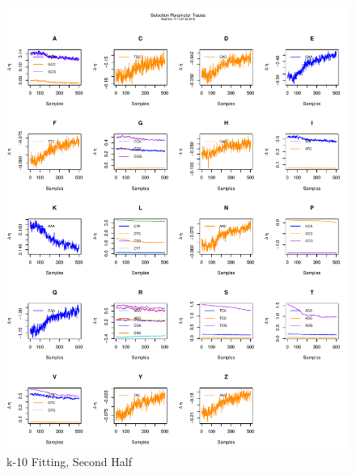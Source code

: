 \documentclass[11pt]{labbook}
\begin{document}
    \begin{figure}
        \centering
        \includegraphics[scale=.65]{FONSE_Plots/2016/December_14/k-10_selection_final}
        \caption{k-10 Fitting, Second Half}
        \label{fig:k-10_2SEL}
    \end{figure}
\end{document}
